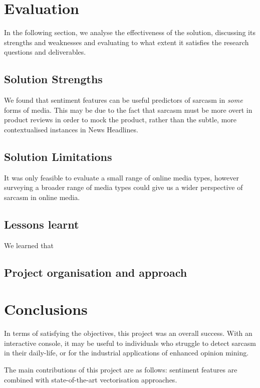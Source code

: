 \documentclass[12pt,a4paper]{article}
\begin{document}
\newpage


\section{Evaluation}
In the following section, we analyse the effectiveness of the solution, discussing its strengths and weaknesses and evaluating to what extent it satisfies the research questions and deliverables.

\subsection{Solution Strengths}
We found that sentiment features can be useful predictors of sarcasm in \textit{some} forms of media. This may be due to the fact that sarcasm must be more overt in product reviews in order to mock the product, rather than the subtle, more contextualised instances in News Headlines.



\subsection{Solution Limitations}
It was only feasible to evaluate a small range of online media types, however surveying a broader range of media types could give us a wider perspective of sarcasm in online media.


\subsection{Lessons learnt}
We learned that 


\subsection{Project organisation and approach}





\section{Conclusions}
In terms of satisfying the objectives, this project was an overall success. With an interactive console, it may be useful to individuals who struggle to detect sarcasm in their daily-life, or for the industrial applications of enhanced opinion mining.

The main contributions of this project are as follows: sentiment features are combined with state-of-the-art vectorisation approaches. 
\end{document}
